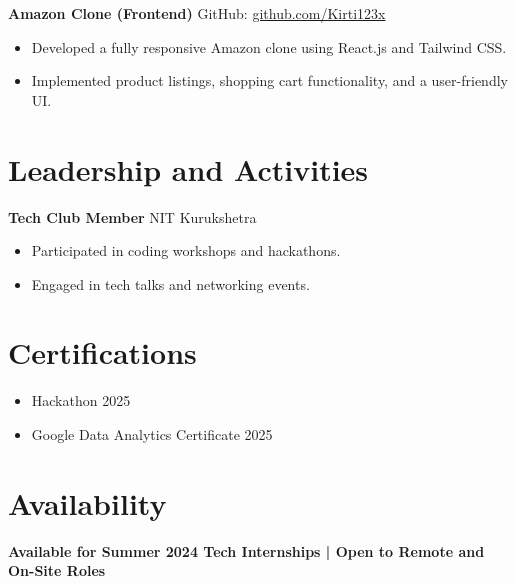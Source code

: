 \documentclass[a4paper,10pt]{article}
\begin{document}
\textbf{Amazon Clone (Frontend)} \hfill GitHub: \href{https://github.com/Kirti123x}{github.com/Kirti123x} \\
\begin{itemize}[leftmargin=10pt]
    \item Developed a fully responsive Amazon clone using React.js and Tailwind CSS.
    \item Implemented product listings, shopping cart functionality, and a user-friendly UI.
\end{itemize}

\section*{Leadership and Activities}
\hline
\vspace{5pt}
\textbf{Tech Club Member} \hfill NIT Kurukshetra \\
\begin{itemize}[leftmargin=10pt]
    \item Participated in coding workshops and hackathons.
    \item Engaged in tech talks and networking events.
\end{itemize}

\section*{Certifications}
\hline
\vspace{5pt}
\begin{itemize}[leftmargin=10pt]
    \item Hackathon \hfill 2025
    \item Google Data Analytics Certificate \hfill 2025
\end{itemize}

\section*{Availability}
\hline
\vspace{5pt}
\begin{center}
    \textbf{Available for Summer 2024 Tech Internships | Open to Remote and On-Site Roles}
\end{center}
\end{document}
